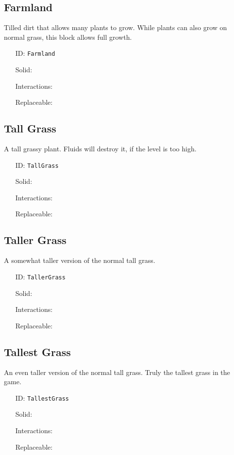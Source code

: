 \subsection{Farmland}\label{subsec:blocks_farmland}
Tilled dirt that allows many plants to grow.
                While plants can also grow on normal grass, this block allows full growth.
\newline
\begin{itemize}[nosep]
\item[ID:] \texttt{Farmland}
\item[Solid:]  \Checkmark \item[Interactions:]  \XSolidBrush \item[Replaceable:]  \XSolidBrush \end{itemize}

\subsection{Tall Grass}\label{subsec:blocks_tall grass}
A tall grassy plant. Fluids will destroy it, if the level is too high.
\newline
\begin{itemize}[nosep]
\item[ID:] \texttt{TallGrass}
\item[Solid:]  \XSolidBrush \item[Interactions:]  \XSolidBrush \item[Replaceable:]  \Checkmark \end{itemize}

\subsection{Taller Grass}\label{subsec:blocks_taller grass}
A somewhat taller version of the normal tall grass.
\newline
\begin{itemize}[nosep]
\item[ID:] \texttt{TallerGrass}
\item[Solid:]  \XSolidBrush \item[Interactions:]  \XSolidBrush \item[Replaceable:]  \Checkmark \end{itemize}

\subsection{Tallest Grass}\label{subsec:blocks_tallest grass}
An even taller version of the normal tall grass.
                Truly the tallest grass in the game.
\newline
\begin{itemize}[nosep]
\item[ID:] \texttt{TallestGrass}
\item[Solid:]  \XSolidBrush \item[Interactions:]  \XSolidBrush \item[Replaceable:]  \XSolidBrush \end{itemize}

